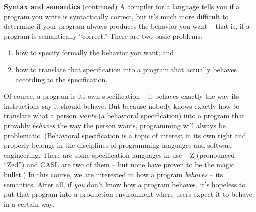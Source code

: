 \begin{minipage}[t]{\sw}
\slidenumber
\LARGE
{\bf Syntax and semantics} (continued)\exx
A compiler for a language tells you
if a program you write is syntactically correct,
but it's much more difficult to determine
if your program always produces the behavior you want --
that is, if a program is semantically ``correct.''\exx
There are two basic problems:
\begin{enumerate}
\item how to specify formally the behavior you want; and
\item how to translate that specification into a program
  that actually behaves according to the specification.
\end{enumerate}
Of course, a program is its own specification --
it behaves exactly the way its instructions say it should behave.
But because nobody knows exactly how to translate
what a person {\em wants} (a behavioral specification)
into a program that provably {\em behaves} the way the person wants,
programming will always be problematic.
(Behavioral specification is a topic of interest in its own right
and properly belongs in the disciplines
of programming languages and software engineering.
There are some specification languages in use --
Z (pronounced ``Zed'') and CASL are two of them --
but none have proven to be the magic bullet.)\exx
In this course, we are interested
in how a program {\em behaves} -- its semantics.
After all, if {\em you} don't know how a program behaves,
it's hopeless to put that program into a production environment
where users expect it to behave in a certain way.

\end{minipage}
